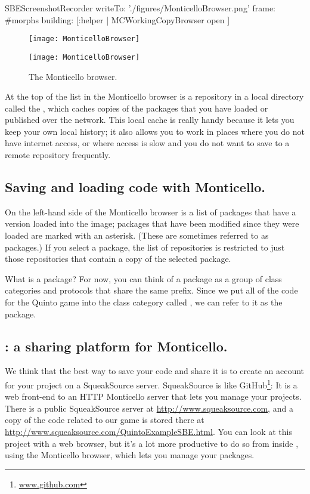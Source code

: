 \documentclass[a4paper,10pt,twoside]{book}
\begin{document}
\begin{ExecuteSmalltalkScript}
SBEScreenshotRecorder writeTo: './figures/MonticelloBrowser.png' frame: #morphs building: [:helper |
  MCWorkingCopyBrowser open
]
\end{ExecuteSmalltalkScript}
\begin{figure}[hbt]
\ifluluelse
	{\centerline {\texttt{[image: MonticelloBrowser]}}}
	{\centerline {\texttt{[image: MonticelloBrowser]}}}
\caption{The Monticello browser.
\label{fig:monticello1}}
\end{figure}

At the top of the list in the Monticello browser is a repository in a local directory called the , which caches copies of the packages that you have loaded or published over the network.
This local cache is really handy because it lets you keep your own local history; it also allows you to work in places where you do not have internet access, or where access is slow and you do not want to save to a remote repository frequently.


\subsection{Saving and loading code with Monticello.}
On the left-hand side of the Monticello browser is a list of packages that have a version loaded into the image; packages that have been modified since they were loaded are marked with an asterisk.
(These are sometimes referred to as  packages.)
If you select a package, the list of repositories is restricted to just those repositories that contain a copy of the selected package.

What is a package?
For now, you can think of a package as a group of class categories and protocols that share the same prefix.
Since we put all of the code for the Quinto game into the class category called , we can refer to it as the  package.


\subsection{: a sharing platform for Monticello.}
We think that the best way to save your code and share it is to create an account for your project on a SqueakSource server.
SqueakSource is like GitHub\footnote{\url{www.github.com}}:
It is a web front-end to an HTTP Monticello server that lets you manage your projects.
There is a public SqueakSource server at \url{http://www.squeaksource.com}, and a copy of the code related to our game is stored there at \url{http://www.squeaksource.com/QuintoExampleSBE.html}.
You can look at this project with a web browser, but it's a lot more productive to do so from inside \squeak, using the Monticello browser, which lets you manage your packages.
\end{document}
